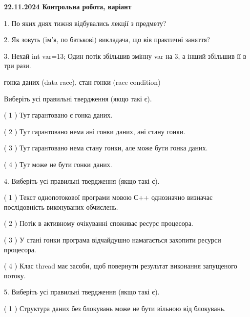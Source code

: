 \documentclass[12pt, ukrainian]{article}
\begin{document}
\vspace{4mm}
\newpage
\begin {large}

\textbf{22.11.2024 Контрольна робота, варіант  }\par


{
1. По яких днях тижня відбувались лекції з предмету?



\vspace{5mm}
2. Як зовуть (ім'я, по батькові) викладача, що вів практичні заняття?



\vspace{5mm}
3. Нехай int var=13; Один потік збільшив змінну var на 3, а інший збільшив її в три рази.

гонка даних (data race), стан гонки (race condition)

Виберіть усі правильні твердження (якщо такі є).\par
\vspace{2mm}
( 1 ) Тут гарантовано є гонка даних.%

( 2 ) Тут гарантовано нема ані гонки даних, ані стану гонки.%

( 3 ) Тут гарантовано нема стану гонки, але може бути гонка даних.%

( 4 ) Тут може не бути гонки даних.%


\vspace{5mm}
4. Виберіть усі правильні твердження (якщо такі є).\par
\vspace{2mm}

( 1 ) Текст однопотокової програми мовою С++ однозначно визначає послідовність виконуваних обчислень.%

( 2 ) Потік в активному очікуванні споживає ресурс процесора.%

( 3 ) У стані гонки програма відчайдушно намагається захопити ресурси процесора.%

( 4 ) Клас thread має засоби, щоб повернути результат виконання запущеного потоку.%


\vspace{5mm}
5. Виберіть усі правильні твердження (якщо такі є).\par
\vspace{2mm}

( 1 ) Структура даних без блокувань може не бути вільною від блокувань.%

}
\end{large}
\end{document}
